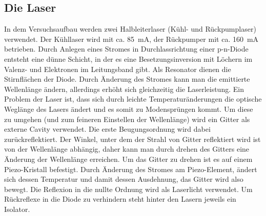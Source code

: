 \documentclass[12pt,a4paper]{article}
\begin{document}
  \subsection{Die Laser}
    In dem Versuchsaufbau werden zwei Halbleiterlaser (Kühl- und Rückpumplaser)
    verwendet. Der Kühllaser wird mit ca. \SI{85}{\mA}, der Rückpumper mit ca.
    \SI{160}{\mA} betrieben. Durch Anlegen eines Stromes in Durchlassrichtung
    einer p-n-Diode entsteht eine dünne Schicht, in der es eine Besetzungsinversion
    mit Löchern im Valenz- und Elektronen im Leitungsband gibt. Als Resonator
    dienen die Stirnflächen der Diode. Durch Änderung des Stromes kann man die
    emittierte Wellenlänge ändern, allerdings erhöht sich gleichzeitig die
    Laserleistung. Ein Problem der Laser ist, dass sich durch leichte
    Temperaturänderungen die optische Weglänge des Lasers ändert und es somit zu
    Modensprüngen kommt. Um diese zu umgehen (und zum feineren Einstellen der
    Wellenlänge) wird ein Gitter als externe Cavity verwendet. Die erste
    Beugungsordnung wird dabei zurückreflektiert. Der Winkel, unter dem der Strahl
    von Gitter reflektiert wird ist von der Wellenlänge abhängig, daher kann man
    durch drehen des Gitters eine Änderung der Wellenlänge erreichen. Um das Gitter
    zu drehen ist es auf einem Piezo-Kristall befestigt. Durch Änderung des Stromes
    am Piezo-Element, ändert sich dessen Temperatur und damit dessen Ausdehnung, das
    Gitter wird also bewegt. Die Reflexion in die nullte Ordnung wird als Laserlicht
    verwendet. Um Rückreflexe in die Diode zu verhindern steht hinter den Lasern
    jeweils ein Isolator.
\end{document}

